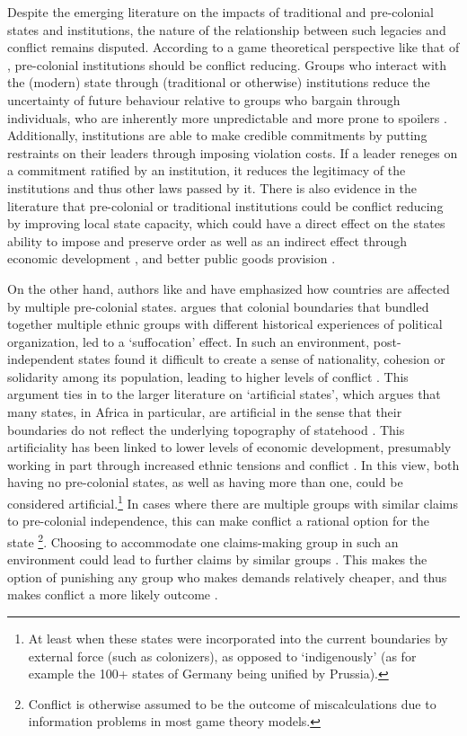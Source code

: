 \documentclass[12pt]{article}
\begin{document}
Despite the emerging literature on the impacts of traditional and pre-colonial
states and institutions, the nature of the relationship between such legacies
and conflict remains disputed. According to a game theoretical perspective like
that of \citet{Fearon1995}, pre-colonial institutions should be conflict
reducing. Groups who interact with the (modern) state through (traditional or
otherwise) institutions reduce the uncertainty of future behaviour relative to
groups who bargain through individuals, who are inherently more unpredictable
and more prone to spoilers \citep{Wig2016}. Additionally, institutions are able
to make credible commitments by putting restraints on their leaders through
imposing violation costs. If a leader reneges on a commitment ratified by an
institution, it reduces the legitimacy of the institutions and thus other laws
passed by it. There is also evidence in the literature that pre-colonial or
traditional institutions could be conflict reducing by improving local state
capacity, which could have a direct effect on the states ability to impose and
preserve order as well as an indirect effect through economic development
\citep{Depetris-Chauvin2016}, and better public goods provision
\citep{Wilfahrt_2021}. 

On the other hand, authors like \citet{Englebert2002} and \citet{Alesina2011}
have emphasized how countries are affected by multiple pre-colonial states.
\citet{Englebert2002} argues that colonial boundaries that bundled together
multiple ethnic groups with different historical experiences of political
organization, led to a `suffocation' effect. In such an environment,
post-independent states found it difficult to create a sense of nationality,
cohesion or solidarity among its population, leading to higher levels of
conflict \citep{Englebert2002}. This argument ties in to the larger literature
on `artificial states', which argues that many states, in Africa in particular,
are artificial in the sense that their boundaries do not reflect the underlying
topography of statehood \citep{Alesina2011}. This artificiality has been linked
to lower levels of economic development, presumably working in part through
increased ethnic tensions and conflict \citep{Alesina2011}. In this view, both
having no pre-colonial states, as well as having more than one, could be
considered artificial.\footnote{At least when these states were incorporated
	into the current boundaries by external force (such as colonizers), as
opposed to `indigenously' (as for example the 100+ states of Germany being
unified by Prussia).} In cases where there are multiple groups with similar
claims to pre-colonial independence, this can make conflict a rational option
for the state \footnote{Conflict is otherwise assumed to be the outcome of
miscalculations due to information problems in most game theory models.}.
Choosing to accommodate one claims-making group in such an environment could
lead to further claims by similar groups \citep{Walter2009}. This makes the
option of punishing any group who makes demands relatively cheaper, and thus
makes conflict a more likely outcome \citep{Wishman}.
\end{document}
